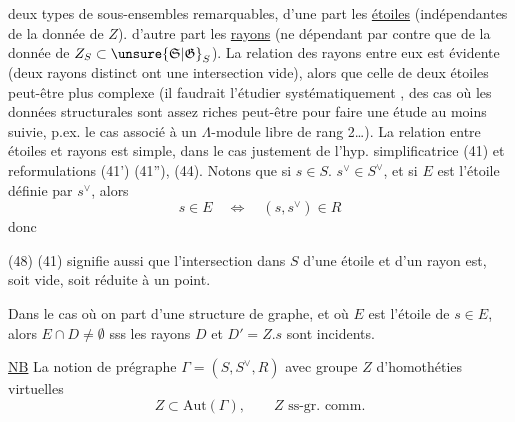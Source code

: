 deux types de sous-ensembles remarquables,
d'une part les \uline{étoiles} (indépendantes de la
donnée de $Z$). d'autre part les \uline{rayons} (ne
dépendant par contre que de la donnée de
$Z_{S}\subset\unsure{\mathfrak S|\mathfrak G}_S$). La relation  des rayons entre
eux est évidente (deux rayons distinct ont une
intersection vide), alors que celle de deux
étoiles peut-être plus complexe (il faudrait
l'étudier systématiquement ,  des cas où les
données structurales sont assez riches peut-être pour
faire une étude  au moins suivie, p.ex.
le cas associé à un  $\Lambda$-module libre de
rang 2\ldots). La relation entre étoiles et rayons
est simple, dans le cas justement de l'hyp.
simplificatrice (41) et reformulations (41') (41''), (44).
 
Notons   
que si $s\in S.$ $s^\vee\in S^\vee$, et si $E$  est l'étoile définie par $s^\vee$,
alors
\[
 s\in E\quad\Longleftrightarrow\quad(s,s^\vee)\in R
\]
donc 

(48)   (41) signifie aussi que l'intersection dans $S$
d'une étoile  et d'un rayon  est, soit vide,
soit réduite à un point.

Dans le cas où on part d'une structure de graphe,
et où $E$ est l'étoile de $s\in E$, alors $E\cap D\ne\emptyset$
sss les rayons $D$ et  $D'=Z.s$
sont incidents.

\uline{NB} La notion de prégraphe $\Gamma=(S,S^\vee,R)$ avec groupe $Z$ d'homothéties virtuelles
\[
 Z\subset\mathrm{Aut}(\Gamma),\qquad Z\text{ ss-gr. comm.}
\]

